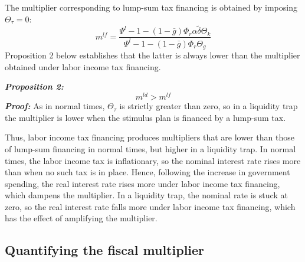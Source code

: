 \documentclass[12pt,letterpaper]{article}
\newcommand{\gbar}{\bar{g}}
\newcommand{\dtilde}{\tilde{\delta}}
\newcommand{\Theg}{\Theta_g}
\newcommand{\Thek}{\Theta_k}
\newcommand{\Thet}{\Theta_\tau}
\newcommand{\Phir}{\Phi_r}
\begin{document}
The multiplier corresponding to lump-sum tax financing is obtained by imposing $\Thet = 0$:
\begin{equation}
m^{lf} = \frac{\Psi^l - 1 - (1-\gbar)\Phir\alpha\dtilde\Thek}{\Psi^l - 1 - (1-\gbar)\Phir\Theg} \tag{53}
\end{equation}
Proposition 2 below establishes that the latter is always lower than the multiplier obtained under labor income tax financing.

\medskip
\noindent\textbf{\emph{Proposition 2:}}
\begin{equation}
m^{ld} > m^{lf} \tag{54}
\end{equation}
\noindent\textbf{\emph{Proof:}} As in normal times, $\Thet$ is strictly greater than zero, so in a liquidity trap the multiplier is lower when the stimulus plan is financed by a lump-sum tax.

\medskip
Thus, labor income tax financing produces multipliers that are lower than those of lump-sum financing in normal times, but higher in a liquidity trap. In normal times, the labor income tax is inflationary, so the nominal interest rate rises more than when no such tax is in place. Hence, following the increase in government spending, the real interest rate rises more under labor income tax financing, which dampens the multiplier. In a liquidity trap, the nominal rate is stuck at zero, so the real interest rate falls more under labor income tax financing, which has the effect of amplifying the multiplier.

\subsection{Quantifying the fiscal multiplier}
\end{document}
